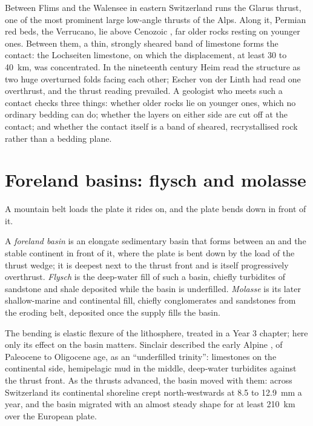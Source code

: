 \begin{inthefield}
Between Flims and the Walensee in eastern Switzerland runs the Glarus thrust, one of the
most prominent large low-angle thrusts of the Alps. Along it, Permian red beds, the
Verrucano, lie above Cenozoic , far older rocks resting on younger ones. Between them, a
thin, strongly sheared band of limestone forms the contact: the Lochseiten limestone, on which the displacement, at least 30 to
\qty{40}{km}, was concentrated. In the nineteenth century Heim read the structure as two huge
overturned folds facing each other; Escher von der Linth had read one overthrust, and the thrust reading prevailed. A geologist who meets such a contact checks
three things: whether older rocks lie on younger ones, which no ordinary bedding can do;
whether the layers on either side are cut off at the contact; and whether the contact
itself is a band of sheared, recrystallised rock rather than a bedding plane.
\end{inthefield}

\section{Foreland basins: flysch and molasse}\label{sec:b2:alpine-orogen:foreland}

A mountain belt loads the plate it rides on, and the plate bends down in front of it.

\begin{definition}\label{def:b2:alpine-orogen:foreland}
A \emph{foreland basin} is an elongate sedimentary basin that forms
between an  and the stable continent in front of it, where the plate is bent down by
the load of the thrust wedge; it is deepest next to the thrust front and is itself
progressively overthrust. \emph{Flysch} is the deep-water fill of such a
basin, chiefly turbidites of sandstone and shale deposited while the basin is underfilled.
\emph{Molasse} is its later shallow-marine and continental fill, chiefly
conglomerates and sandstones from the eroding belt, deposited once the supply fills the
basin.
\end{definition}

The bending is elastic flexure of the lithosphere, treated in a Year 3
chapter; here only its effect on the basin matters. Sinclair described the early Alpine , of Paleocene to Oligocene age,
as an ``underfilled trinity'': limestones on the continental side, hemipelagic mud in the
middle, deep-water turbidites against the thrust front. As the thrusts advanced, the basin
moved with them: across Switzerland its continental shoreline crept north-westwards at 8.5
to \qty{12.9}{mm} a year, and the basin migrated with an almost steady shape for at least
\qty{210}{km} over the European plate.

